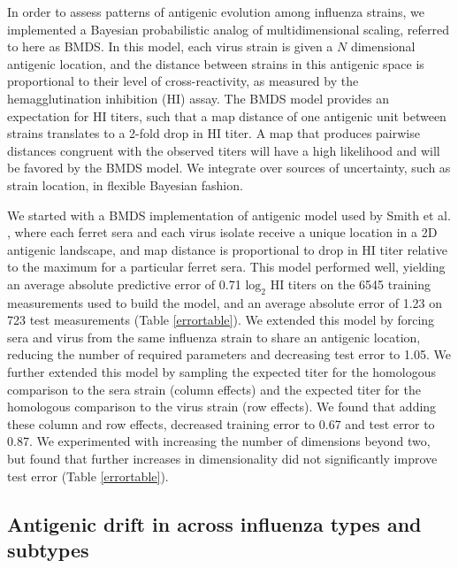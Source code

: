 \documentclass[11pt,oneside,letterpaper]{article}
\begin{document}
In order to assess patterns of antigenic evolution among influenza strains, we implemented a Bayesian probabilistic analog of multidimensional scaling, referred to here as BMDS.
In this model, each virus strain is given a $N$ dimensional antigenic location, and the distance between strains in this antigenic space is proportional to their level of cross-reactivity, as measured by the hemagglutination inhibition (HI) assay.
The BMDS model provides an expectation for HI titers, such that a map distance of one antigenic unit between strains translates to a 2-fold drop in HI titer.
A map that produces pairwise distances congruent with the observed titers will have a high likelihood and will be favored by the BMDS model.
We integrate over sources of uncertainty, such as strain location, in flexible Bayesian fashion.

We started with a BMDS implementation of antigenic model used by Smith et al. \cite{Smith04}, where each ferret sera and each virus isolate receive a unique location in a 2D antigenic landscape, and map distance is proportional to drop in HI titer relative to the maximum for a particular ferret sera.
This model performed well, yielding an average absolute predictive error of 0.71 $\mathrm{log}_2$ HI titers on the 6545 training measurements used to build the model, and an average absolute error of 1.23 on 723 test measurements (Table \ref{errortable}).
We extended this model by forcing sera and virus from the same influenza strain to share an antigenic location, reducing the number of required parameters and decreasing test error to 1.05.
We further extended this model by sampling the expected titer for the homologous comparison to the sera strain (column effects) and the expected titer for the homologous comparison to the virus strain (row effects).
We found that adding these column and row effects, decreased training error to 0.67 and test error to 0.87.
We experimented with increasing the number of dimensions beyond two, but found that further increases in dimensionality did not significantly improve test error (Table \ref{errortable}).

\subsection*{Antigenic drift in across influenza types and subtypes}
\end{document}
